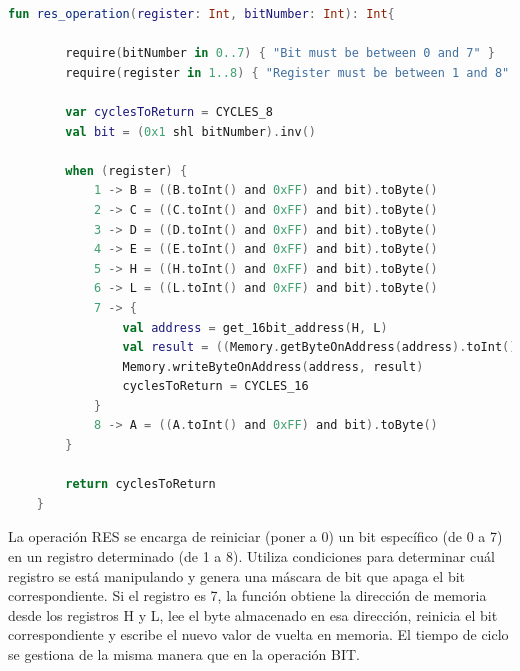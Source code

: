 \begin{lstlisting}[language=Kotlin, caption={Operación RES}, label={code:kotlinres}]
    fun res_operation(register: Int, bitNumber: Int): Int{

        require(bitNumber in 0..7) { "Bit must be between 0 and 7" }
        require(register in 1..8) { "Register must be between 1 and 8" }

        var cyclesToReturn = CYCLES_8
        val bit = (0x1 shl bitNumber).inv()

        when (register) {
            1 -> B = ((B.toInt() and 0xFF) and bit).toByte()
            2 -> C = ((C.toInt() and 0xFF) and bit).toByte()
            3 -> D = ((D.toInt() and 0xFF) and bit).toByte()
            4 -> E = ((E.toInt() and 0xFF) and bit).toByte()
            5 -> H = ((H.toInt() and 0xFF) and bit).toByte()
            6 -> L = ((L.toInt() and 0xFF) and bit).toByte()
            7 -> {
                val address = get_16bit_address(H, L)
                val result = ((Memory.getByteOnAddress(address).toInt() and 0xFF) and bit).toByte()
                Memory.writeByteOnAddress(address, result)
                cyclesToReturn = CYCLES_16
            }
            8 -> A = ((A.toInt() and 0xFF) and bit).toByte()
        }

        return cyclesToReturn
    }
\end{lstlisting}

La operación RES se encarga de reiniciar (poner a 0) un bit específico (de 0 a 7) en un registro determinado (de 1 a 8). Utiliza condiciones para determinar cuál registro se está manipulando y genera una máscara de bit que apaga el bit correspondiente. Si el registro es 7, la función obtiene la dirección de memoria desde los registros H y L, lee el byte almacenado en esa dirección, reinicia el bit correspondiente y escribe el nuevo valor de vuelta en memoria. El tiempo de ciclo se gestiona de la misma manera que en la operación BIT.

